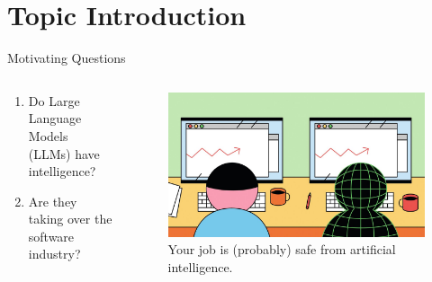 \section{Topic Introduction}

\begin{frame}{Motivating Questions}
    \begin{columns}[T]
        \begin{column}{0.5\textwidth}
            \begin{enumerate}
                \item Do Large Language Models (LLMs) have intelligence?
                \item Are they taking over the software industry?
            \end{enumerate}
        \end{column}
        \begin{column}{0.5\textwidth}
            \begin{figure}[!htb]
                \centering
                \includegraphics[scale=0.10]{img/ai_taking_jobs}
                \captionsetup{font=small}
                \caption{Your job is (probably) safe from artificial intelligence.\footnotemark[1]}
            \end{figure}
        \end{column}
    \end{columns}
\end{frame}

